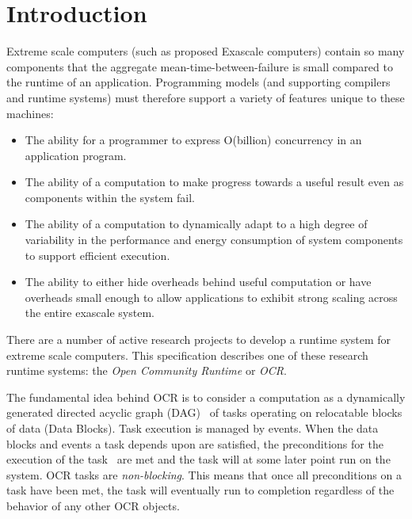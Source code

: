 %

\chapter{Introduction}
\label{chap:introduction}
Extreme scale computers (such as proposed Exascale computers) contain
so many components that the aggregate mean-time-between-failure is small
compared to the runtime of an application. Programming models (and
supporting compilers and runtime systems) must therefore support a
variety of features unique to these machines:
\begin{itemize}
\item The ability for a programmer to
express O(billion) concurrency in an application program.

\item The ability of a computation to make progress towards a useful
result even as components within the system fail.

\item The ability of a computation to dynamically adapt to a high
degree of variability in the performance and energy consumption of
system components to support efficient execution.

\item The ability to either hide overheads behind useful computation
or have overheads small enough to allow applications to exhibit strong
scaling across the entire exascale system.

\end{itemize}

There are a number of active research projects to develop a runtime system
for extreme scale computers. This specification describes one of
these research runtime systems: the \emph{Open Community Runtime} or \emph{OCR}.

The fundamental idea behind OCR is to consider a computation as a
dynamically generated directed acyclic graph (DAG) ~\cite{TaSa11,Tasirlar11,Zuckerman:2011:UCP:2000417.2000424}of tasks
operating on relocatable blocks of data (Data Blocks). Task execution is managed by events.
When the data blocks and events a task depends upon are satisfied, the
preconditions for the execution of the task~\cite{SSWS13} are met and the
task will at some later point run on the system.   OCR tasks are
\emph{non-blocking}. This means that once all
preconditions on a task have been met,  the task will eventually run to completion
regardless of the behavior of any other OCR objects.

